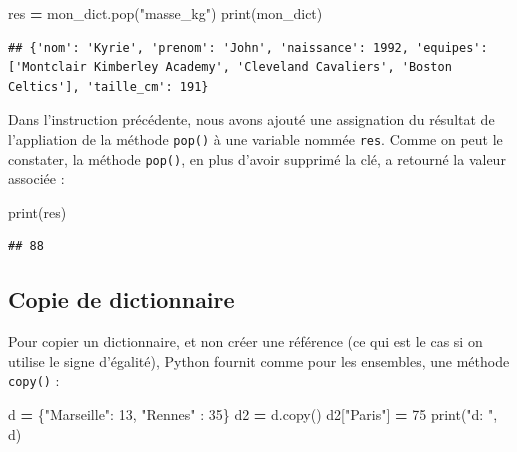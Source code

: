 \documentclass[
  12pt,
]{book}
\newenvironment{Shaded}{\begin{snugshade}}{\end{snugshade}}
\newcommand{\BuiltInTok}[1]{#1}
\newcommand{\DecValTok}[1]{\textcolor[rgb]{0.00,0.00,0.81}{#1}}
\newcommand{\NormalTok}[1]{#1}
\newcommand{\OperatorTok}[1]{\textcolor[rgb]{0.81,0.36,0.00}{\textbf{#1}}}
\newcommand{\StringTok}[1]{\textcolor[rgb]{0.31,0.60,0.02}{#1}}
\numberwithin{equation}{section}
\numberwithin{countremarque}{section}
\begin{document}
\begin{Shaded}
\begin{Highlighting}[]
\NormalTok{res }\OperatorTok{=}\NormalTok{ mon\_dict.pop(}\StringTok{"masse\_kg"}\NormalTok{)}
\BuiltInTok{print}\NormalTok{(mon\_dict)}
\end{Highlighting}
\end{Shaded}

\begin{lstlisting}
## {'nom': 'Kyrie', 'prenom': 'John', 'naissance': 1992, 'equipes': ['Montclair Kimberley Academy', 'Cleveland Cavaliers', 'Boston Celtics'], 'taille_cm': 191}
\end{lstlisting}

Dans l'instruction précédente, nous avons ajouté une assignation du résultat de l'appliation de la méthode \texttt{pop()} à une variable nommée \texttt{res}. Comme on peut le constater, la méthode \texttt{pop()}, en plus d'avoir supprimé la clé, a retourné la valeur associée :

\begin{Shaded}
\begin{Highlighting}[]
\BuiltInTok{print}\NormalTok{(res)}
\end{Highlighting}
\end{Shaded}

\begin{lstlisting}
## 88
\end{lstlisting}

\subsection{Copie de dictionnaire}\label{copie-de-dictionnaire}

Pour copier un dictionnaire, et non créer une référence (ce qui est le cas si on utilise le signe d'égalité), Python fournit comme pour les ensembles, une méthode \texttt{copy()} :

\begin{Shaded}
\begin{Highlighting}[]
\NormalTok{d }\OperatorTok{=}\NormalTok{ \{}\StringTok{"Marseille"}\NormalTok{: }\DecValTok{13}\NormalTok{, }\StringTok{"Rennes"}\NormalTok{ : }\DecValTok{35}\NormalTok{\}}
\NormalTok{d2 }\OperatorTok{=}\NormalTok{ d.copy()}
\NormalTok{d2[}\StringTok{"Paris"}\NormalTok{] }\OperatorTok{=} \DecValTok{75}
\BuiltInTok{print}\NormalTok{(}\StringTok{"d: "}\NormalTok{, d)}
\end{Highlighting}
\end{Shaded}
\end{document}
